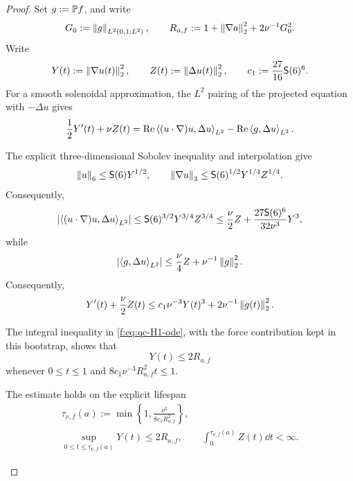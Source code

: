 \begin{proof}
Set \(g:=\mathbb P f\), and write
\[
 G_0:=\left\lVert g\right\rVert_{L^2(0,1;L^2)},
 \qquad
 R_{a,f}:=1+\left\lVert \nabla a\right\rVert_2^2+2\nu^{-1}G_0^2.
\]
Write
\[
 Y(t):=\left\lVert \nabla u(t)\right\rVert_2^2,
 \qquad
 Z(t):=\left\lVert \Delta u(t)\right\rVert_2^2,
 \qquad
 c_1:=\frac{27}{16}\mathsf S(6)^6.
\]
For a smooth solenoidal approximation, the \(L^2\) pairing of the projected
equation with \(-\Delta u\) gives
\begin{equation}
 \frac12Y'(t)+\nu Z(t)
 =\operatorname{Re}\left\langle (u\cdot\nabla)u,\Delta u\right\rangle_{L^2}
 -\operatorname{Re}\left\langle g,\Delta u\right\rangle_{L^2}.
 \label{f:eq:qc-H1-energy-pairing}
\end{equation}
\begin{samepage}
The explicit three-dimensional Sobolev inequality and interpolation give
\[
 \left\lVert u\right\rVert_6\le\mathsf S(6)Y^{1/2},
 \qquad
 \left\lVert \nabla u\right\rVert_3
 \le\mathsf S(6)^{1/2}Y^{1/4}Z^{1/4}.
\]
Consequently,
\[
 \left|\left\langle (u\cdot\nabla)u,\Delta u\right\rangle_{L^2}\right|
 \le \mathsf S(6)^{3/2}Y^{3/4}Z^{3/4}
 \le\frac\nu2Z+\frac{27\mathsf S(6)^6}{32\nu^3}Y^3,
\]
while
\[
 \left|\left\langle g,\Delta u\right\rangle_{L^2}\right|
 \le\frac\nu4Z+\nu^{-1}\left\lVert g\right\rVert_2^2.
\]
Consequently,
\begin{equation}
 Y'(t)+\frac\nu2 Z(t)
 \le c_1\nu^{-3}Y(t)^3+2\nu^{-1}\left\lVert g(t)\right\rVert_2^2.
 \label{f:eq:qc-H1-ode}
\end{equation}
\par
\end{samepage}
\begin{samepage}
The integral inequality in \eqref{f:eq:qc-H1-ode}, with the force contribution
kept in this bootstrap, shows that
\begin{equation}
 Y(t)\le2R_{a,f}
 \label{f:eq:qc-H1-local-explicit}
\end{equation}
whenever \(0\le t\le1\) and
\(8c_1\nu^{-3}R_{a,f}^2t\le1\).
\par
\end{samepage}
\begin{samepage}
The estimate holds on the explicit lifespan
\begin{equation}
 \begin{aligned}
 \tau_{\nu,f}(a):=
 \min\left\{1,
 \frac{\nu^3}{8c_1R_{a,f}^2}
 \right\},\\
 \sup_{0\le t\le\tau_{\nu,f}(a)}Y(t)\le2R_{a,f},
 \qquad
 \int_0^{\tau_{\nu,f}(a)}Z(t)\dd t<\infty.
 \end{aligned}
 \label{f:eq:qc-H1-local-lifespan}
\end{equation}
\par
\end{samepage}

\end{proof}

